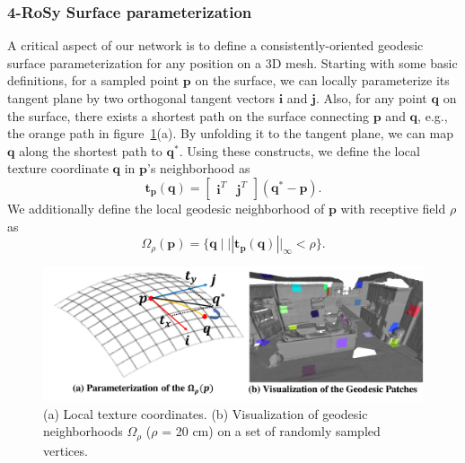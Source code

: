 \subsubsection{4-RoSy Surface parameterization}
\label{sec:texturenet-approach-param}
 A critical aspect of our network is to define a consistently-oriented geodesic surface parameterization for any position on a 3D mesh. Starting with some basic definitions, for a sampled point $\mathbf{p}$ on the surface, we can locally parameterize its tangent plane by two orthogonal tangent vectors $\mathbf{i}$ and $\mathbf{j}$.  Also, for any point $\mathbf{q}$ on the surface, there exists a shortest path on the surface connecting $\mathbf{p}$ and $\mathbf{q}$, e.g., the orange path in figure~\ref{fig:texturenet-geodesic}(a). By unfolding it to the tangent plane, we can map $\mathbf{q}$ along the shortest path to $\mathbf{q^*}$.   Using these constructs, we define the local texture coordinate $\mathbf{q}$ in $\mathbf{p}$'s neighborhood as
 \begin{equation*}
     \mathbf{t}_{\mathbf{p}}(\mathbf{q}) = \begin{bmatrix}
     \mathbf{i}^T & \mathbf{j}^T
     \end{bmatrix}(\mathbf{q}^*-\mathbf{p}).
 \end{equation*}
 We additionally define the local geodesic neighborhood of $\mathbf{p}$ with receptive field $\rho$ as
\begin{equation}
\Omega_\rho(\mathbf{p}) = \{\mathbf{q}\;|\;||\mathbf{t}_{\mathbf{p}}(\mathbf{q})||_\infty < \rho\}.
\label{eq:texturenet-omega}
\end{equation}
\begin{figure}
    \centering
    \includegraphics[width=\linewidth]{texturenet/geodesic/neighbor.pdf}
    \caption{(a) Local texture coordinates. (b) Visualization of geodesic neighborhoods $\Omega_\rho$ ($\rho$ = 20 cm) on a set of randomly sampled vertices.}
    \label{fig:texturenet-geodesic}
\end{figure}
